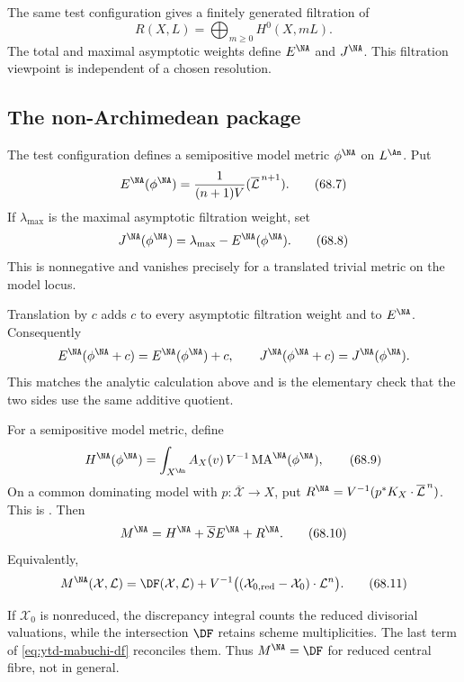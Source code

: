 The same test configuration gives a finitely generated filtration of
\[
                          R(X,L)=\bigoplus_{m\geq0}H^0(X,mL).
\]
The total and maximal asymptotic weights define
$E^{\NA}$ and $J^{\NA}$. This filtration viewpoint is independent
of a chosen resolution.

\subsection{The non-Archimedean package}
\label{subsec:ytd-nonarchimedean}

The test configuration defines a semipositive model metric
$\phi^{\NA}$ on $L^{\An}$. Put
\[
 E^{\NA}(\phi^{\NA})
    =\frac{1}{(n+1)V}
         (\overline{\mathcal L}^{\,n+1}).
\tag{68.7}\label{eq:ytd-na-energy}
\]
If $\lambda_{\max}$ is the maximal asymptotic filtration weight, set
\[
                         J^{\NA}(\phi^{\NA})
             =\lambda_{\max}-E^{\NA}(\phi^{\NA}).
\tag{68.8}\label{eq:ytd-na-j}
\]
This is nonnegative and vanishes precisely for a translated trivial
metric on the model locus.

Translation by $c$ adds $c$ to every asymptotic filtration weight and
to $E^{\NA}$. Consequently
\[
 E^{\NA}(\phi^{\NA}+c)=E^{\NA}(\phi^{\NA})+c,
 \qquad
 J^{\NA}(\phi^{\NA}+c)=J^{\NA}(\phi^{\NA}).
\]
This matches the analytic calculation above and is the elementary check
that the two sides use the same additive quotient.

\begin{definition}
\label{def:ytd-na-mabuchi}
For a semipositive model metric, define
\[
 H^{\NA}(\phi^{\NA})
    =\int_{X^{\An}}A_X(v)\,
          V^{-1}\operatorname{MA}^{\NA}(\phi^{\NA}),
\tag{68.9}\label{eq:ytd-na-entropy}
\]
On a common dominating model with $p:\overline{\mathcal X}\to X$, put
$R^{\NA}=V^{-1}(p^*K_X\cdot\overline{\mathcal L}^{\,n})$.
This is \cite[Definition~7.20]{BHJ17}. Then
\[
 M^{\NA}
     =H^{\NA}+\overline S E^{\NA}+R^{\NA}.
\tag{68.10}\label{eq:ytd-na-mabuchi}
\]
Equivalently,
\[
 M^{\NA}(\mathcal X,\mathcal L)
  =\DF(\mathcal X,\mathcal L)
   +V^{-1}
     \bigl((\mathcal X_{0,\mathrm{red}}-\mathcal X_0)
               \cdot\mathcal L^n\bigr).
\tag{68.11}\label{eq:ytd-mabuchi-df}
\]
\end{definition}

\begin{remark}
\label{rem:ytd-central-correction}
If $\mathcal X_0$ is nonreduced, the discrepancy integral counts
the reduced divisorial valuations, while the intersection
$\DF$ retains scheme multiplicities. The last term of
\eqref{eq:ytd-mabuchi-df} reconciles them. Thus
$M^{\NA}=\DF$ for reduced central fibre, not in general.
\end{remark}


